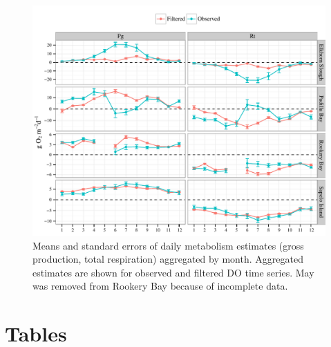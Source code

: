 \documentclass[letterpaper,12pt,oneside]{article}\usepackage[]{graphicx}\usepackage[]{color}
\makeatletter
\def\maxwidth{ %
  \ifdim\Gin@nat@width>\linewidth
    \linewidth
  \else
    \Gin@nat@width
  \fi
}
\newenvironment{knitrout}{}{} %
\makeatother
\begin{document}
\centering\vspace*{\fill}
\begin{knitrout}
\color{fgcolor}\begin{figure}[!ht]


{\centering \includegraphics[width=\maxwidth]{figure/metab_sum} 

}

\caption[Means and standard errors of daily metabolism estimates (gross production, total respiration) aggregated by month]{Means and standard errors of daily metabolism estimates (gross production, total respiration) aggregated by month.  Aggregated estimates are shown for observed and filtered \ac{DO} time series.  May was removed from Rookery Bay because of incomplete data.\label{fig:metab_sum}}
\end{figure}


\end{knitrout}
\vfill
\clearpage


\section{Tables}
\end{document}
